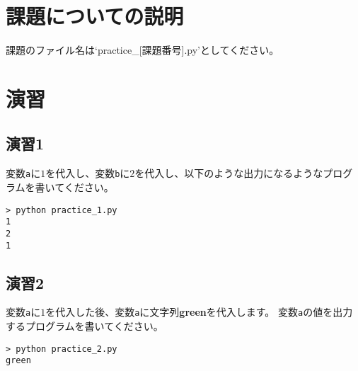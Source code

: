 \documentclass[a4paper,titlepage,dvipdfmx]{jarticle}
\begin{document}
\section{課題についての説明}
課題のファイル名は`practice\_[課題番号].py'としてください。

\section{演習}
\subsection*{演習1}
変数\texttt{a}に$1$を代入し、変数\texttt{b}に$2$を代入し、以下のような出力になるようなプログラムを書いてください。
\begin{lstlisting}
> python practice_1.py
1
2
1
\end{lstlisting}

\subsection*{演習2}
変数\texttt{a}に$1$を代入した後、変数\texttt{a}に文字列\textbf{green}を代入します。
変数\texttt{a}の値を出力するプログラムを書いてください。
\begin{lstlisting}
> python practice_2.py
green
\end{lstlisting}
\end{document}
